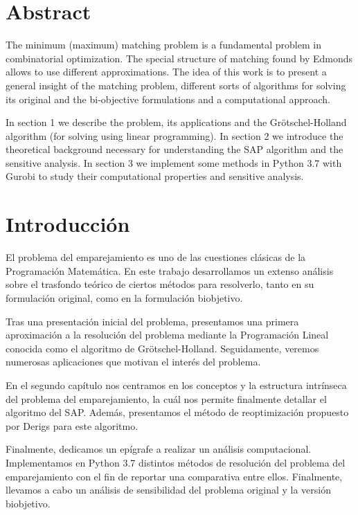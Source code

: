 \documentclass[twoside,a4paper,openright,12pt]{book}
\begin{document}
\newpage
\thispagestyle{empty}

\tableofcontents
\newpage
\thispagestyle{empty}

\chapter*{Abstract}
The minimum (maximum) matching problem is a fundamental problem in combinatorial optimization. The special structure of matching found by Edmonds allows to use different approximations. The idea of this work is to present a general insight of the matching problem, different sorts of algorithms for solving its original and the bi-objective formulations and a computational approach. 

In section 1 we describe the problem, its applications and the Grötschel-Holland algorithm (for solving using linear programming). In section 2 we introduce the theoretical background necessary for understanding the SAP algorithm and the sensitive analysis. In section 3 we implement some methods in Python 3.7 with Gurobi to study their computational properties and sensitive analysis.
\newpage
\thispagestyle{empty}

\chapter*{Introducci\'on}\label{cap.introduccion}
El problema del emparejamiento es uno de las cuestiones clásicas de la Programación Matemática. En este trabajo desarrollamos un extenso análisis sobre el trasfondo teórico de ciertos métodos para resolverlo, tanto en su formulación original, como en la formulación biobjetivo.

Tras una presentación inicial del problema, presentamos una primera aproximación a la resolución del problema mediante la Programación Lineal conocida como el algoritmo de Grötschel-Holland. Seguidamente, veremos numerosas aplicaciones que motivan el interés del problema.

En el segundo capítulo nos centramos en los conceptos y la estructura intrínseca del problema del emparejamiento, la cuál nos permite finalmente detallar el algoritmo del SAP. Además, presentamos el método de reoptimización propuesto por Derigs para este algoritmo.

Finalmente, dedicamos un epígrafe a realizar un análisis computacional. Implementamos en Python 3.7 distintos métodos de resolución del problema del emparejamiento con el fin de reportar una comparativa entre ellos. Finalmente, llevamos a cabo un análisis de sensibilidad del problema original y la versión biobjetivo.
\newpage
\thispagestyle{empty}
\end{document}
